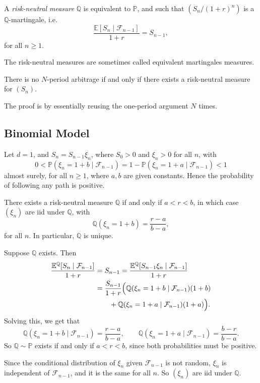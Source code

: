 \documentclass[12pt]{article}
\begin{document}
\begin{definition}
	A \emph{risk-neutral measure} $\mathbb{Q}$ is equivalent to $\mathbb{P}$, and such that $(S_n/(1+r)^n)$ is a $\mathbb{Q}$-martingale, i.e.
	\[
	\frac{\mathbb{E}[S_n \mid \mathcal{F}_{n-1}]}{1+r} = S_{n-1},
	\]
	for all $n \geq 1$.
\end{definition}

\begin{remark}
	The risk-neutral measures are sometimes called equivalent martingales measures.
\end{remark}

\begin{theorem}
	There is no $N$-period arbitrage if and only if there exists a risk-neutral measure for $(S_n)$.
\end{theorem}

The proof is by essentially reusing the one-period argument $N$ times.

\subsection{Binomial Model}%
\label{sub:bin_mod}

Let $d = 1$, and $S_n = S_{n-1} \xi_n$, where $S_0 > 0$ and $\xi_n > 0$ for all $n$, with
\[
0 < \mathbb{P}(\xi_n = 1 + b \mid \mathcal{F}_{n-1}) = 1 - \mathbb{P}(\xi_n = 1 + a \mid \mathcal{F}_{n-1}) < 1
\]
almost surely, for all $n \geq 1$, where $a, b$ are given constants. Hence the probability of following any path is positive.

\begin{theorem}
	There exists a risk-neutral measure $\mathbb{Q}$ if and only if $a < r < b$, in which case $(\xi_n)$ are iid under $\mathbb{Q}$, with
	\[
	\mathbb{Q}(\xi_n = 1 + b) = \frac{r - a}{b - a},
	\]
	for all $n$. In particular, $\mathbb{Q}$ is unique.
\end{theorem}

\begin{proofbox}
	Suppose $\mathbb{Q}$ exists. Then
	\begin{align*}
	\frac{\mathbb{E}^{\mathbb{Q}}[S_n \mid \mathcal{F}_{n-1}]}{1 + r} &= S_{n-1} = \frac{\mathbb{E}^{\mathbb{Q}}[S_{n-1}\xi_n \mid \mathcal{F}_{n-1}]}{1+r} \\
										  &= \frac{S_{n-1}}{1 + r} \Bigl( \mathbb{Q}(\xi_n = 1 + b \mid \mathcal{F}_{n-1})(1 + b) \\
										  &\qquad+ \mathbb{Q}(\xi_n = 1 + a \mid \mathcal{F}_{n-1})(1 + a)\Bigr).
	\end{align*}
	Solving this, we get that
	\[
	\mathbb{Q}(\xi_n = 1 + b \mid \mathcal{F}_{n-1}) = \frac{r - a}{b - a}, \qquad \mathbb{Q}(\xi_n = 1 + a \mid \mathcal{F}_{n-1}) = \frac{b - r}{b - a}.
	\]
	So $\mathbb{Q} \sim \mathbb{P}$ exists if and only if $a < r < b$, since both probabilities must be positive.

	Since the conditional distribution of $\xi_n$ given $\mathcal{F}_{n-1}$ is not random, $\xi_n$ is independent of $\mathcal{F}_{n-1}$, and it is the same for all $n$. So $(\xi_n)$ are iid under $\mathbb{Q}$.
\end{proofbox}
\end{document}
